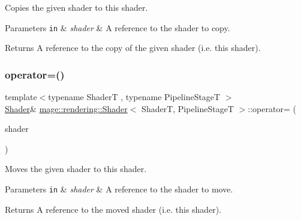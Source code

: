 Copies the given shader to this shader.


\begin{DoxyParams}[1]{Parameters}
\mbox{\tt in}  & {\em shader} & A reference to the shader to copy. \\
\hline
\end{DoxyParams}
\begin{DoxyReturn}{Returns}
A reference to the copy of the given shader (i.\+e. this shader). 
\end{DoxyReturn}
\hypertarget{classmage_1_1rendering_1_1_shader_a940217c505f3994d1f6057345d52cb36}{}\label{classmage_1_1rendering_1_1_shader_a940217c505f3994d1f6057345d52cb36} 
\subsubsection{\texorpdfstring{operator=()}{operator=()}\hspace{0.1cm}{\footnotesize\ttfamily [2/2]}}
{\footnotesize\ttfamily template$<$typename ShaderT , typename Pipeline\+StageT $>$ \\
\hyperlink{classmage_1_1rendering_1_1_shader}{Shader}\& \hyperlink{classmage_1_1rendering_1_1_shader}{mage\+::rendering\+::\+Shader}$<$ ShaderT, Pipeline\+StageT $>$\+::operator= (\begin{DoxyParamCaption}\item[{\hyperlink{classmage_1_1rendering_1_1_shader}{Shader}$<$ ShaderT, Pipeline\+StageT $>$ \&\&}]{shader }\end{DoxyParamCaption})\hspace{0.3cm}{\ttfamily [noexcept]}}

Moves the given shader to this shader.


\begin{DoxyParams}[1]{Parameters}
\mbox{\tt in}  & {\em shader} & A reference to the shader to move. \\
\hline
\end{DoxyParams}
\begin{DoxyReturn}{Returns}
A reference to the moved shader (i.\+e. this shader). 
\end{DoxyReturn}
\hypertarget{classmage_1_1rendering_1_1_shader_ad8b71024d802eb02d9017d767da995d8}{}\label{classmage_1_1rendering_1_1_shader_ad8b71024d802eb02d9017d767da995d8} 
